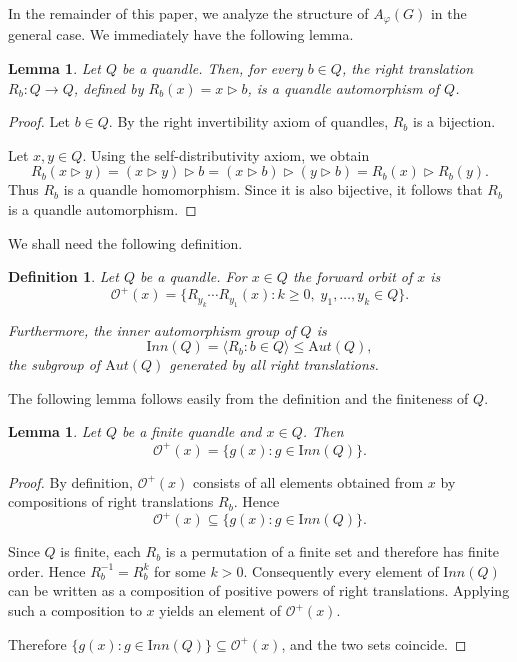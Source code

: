 \documentclass[english,11pt]{amsart}
\newtheorem{Lemma}[Theorem]{Lemma}
\newtheorem{Def}[Theorem]{Definition}
\newcommand{\Aut}{{\mathrm Aut}}
\newcommand{\Inn}{{\mathrm Inn}}
\begin{document}
In the remainder of this paper, we analyze the structure of $A_\varphi(G)$ in the general case. 
We immediately have the following lemma.

\begin{Lemma}
Let $Q$ be a quandle. Then,  for every $b \in Q$, the right translation $R_b : Q \to Q$, defined by $R_b(x) = x \rhd b$, is a quandle automorphism of $Q$.
\end{Lemma}

\begin{proof}
Let $b \in Q$. By the right invertibility axiom of quandles, $R_b$ is a bijection.

Let $x,y \in Q$. Using the self-distributivity axiom, we obtain
\[
R_b(x \rhd y) = (x \rhd y) \rhd b = (x \rhd b) \rhd (y \rhd b) = R_b(x) \rhd R_b(y).
\]
Thus $R_b$ is a quandle homomorphism. Since it is also bijective, it follows that $R_b$ is a quandle automorphism.
\end{proof}

We shall need the following definition.

\begin{Def}
Let $Q$ be a quandle. For $x \in Q$ the \emph{forward orbit} of $x$ is
\[
\mathcal O^{+}(x)
  = \{ R_{y_k}\cdots R_{y_1}(x) : k \ge 0,\; y_1,\ldots,y_k \in Q \}.
\]

Furthermore, the \emph{inner automorphism group} of $Q$ is
\[
\Inn(Q)=\langle R_b : b \in Q\rangle \le \Aut(Q),
\]
the subgroup of $\Aut(Q)$ generated by all right translations.
\end{Def}


The following lemma follows easily from the definition and the finiteness of $Q$.

\begin{Lemma}
\label{inng}
Let $Q$ be a finite quandle and $x \in Q$. Then
\[
\mathcal O^+(x)=\{g(x) : g \in \Inn(Q)\}.
\]
\end{Lemma}

\begin{proof}
By definition, $\mathcal O^+(x)$ consists of all elements obtained from $x$ by compositions of right translations $R_b$. Hence
\[
\mathcal O^+(x) \subseteq \{g(x):g\in\Inn(Q)\}.
\]

Since $Q$ is finite, each $R_b$ is a permutation of a finite set and therefore has finite order. Hence $R_b^{-1}=R_b^{k}$ for some $k>0$. Consequently every element of $\Inn(Q)$ can be written as a composition of positive powers of right translations. Applying such a composition to $x$ yields an element of $\mathcal O^+(x)$.

Therefore $\{g(x):g\in\Inn(Q)\}\subseteq \mathcal O^+(x)$, and the two sets coincide.
\end{proof}
\end{document}
